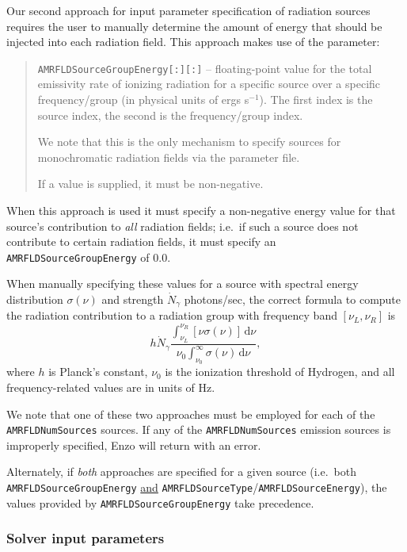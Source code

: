 \documentclass[10pt]{article}
\renewcommand{\(}{\left(}
\renewcommand{\)}{\right)}
\begin{document}
Our second approach for input parameter specification of radiation
sources requires the user to manually determine the amount of energy
that should be injected into each radiation field.  This approach
makes use of the parameter:
%
\blockquote{{\tt AMRFLDSourceGroupEnergy[:][:]} -- floating-point
  value for the total emissivity rate of ionizing radiation for a
  specific source over a specific frequency/group (in physical units
  of ergs s$^{-1}$).  The first index is the source index, the second
  is the frequency/group index. 

  We note that this is the only mechanism to specify sources
  for monochromatic radiation fields via the parameter file.

  If a value is supplied, it must be non-negative.}
%
When this approach is used it must specify a non-negative energy value
for that source's contribution to {\em all} radiation fields; i.e.~if
such a source does not contribute to certain radiation fields, it must
specify an {\tt AMRFLDSourceGroupEnergy} of 0.0.

When manually specifying these values for a source with spectral
energy distribution $\sigma(\nu)$ and strength $\dot{N}_{\gamma}$
photons/sec, the correct formula to compute the radiation contribution
to a radiation group with frequency band $\left[\nu_L, \nu_R\right]$ is
\begin{equation}
  \label{eq:emission_integral}
  h \dot{N}_{\gamma} 
  \frac{\int_{\nu_L}^{\nu_R}\left[\nu \sigma(\nu)\right]\,\mathrm d\nu}
       {\nu_0 \int_{\nu_0}^{\infty}\sigma(\nu)\,\mathrm d\nu},
\end{equation}
where $h$ is Planck's constant, $\nu_0$ is the ionization threshold of
Hydrogen, and all frequency-related values are in units of Hz.

We note that one of these two approaches must be employed for
each of the {\tt AMRFLDNumSources} sources.  If any of the 
{\tt AMRFLDNumSources} emission sources is improperly specified, Enzo
will return with an error.

Alternately, if {\em both} approaches are specified for a given source
(i.e.~both {\tt AMRFLDSourceGroupEnergy} \underline{and} 
{\tt AMRFLDSourceType}/{\tt AMRFLDSourceEnergy}), the values provided by
{\tt AMRFLDSourceGroupEnergy} take precedence.





\subsubsection{Solver input parameters}
\label{sec:solver_input_parameters}
\end{document}
